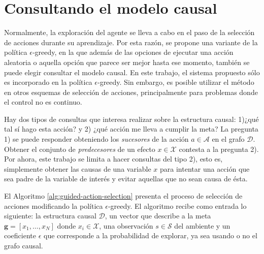\section{Consultando el modelo causal}

Normalmente, la exploración del agente se lleva a cabo en el paso de la selección de acciones
durante su aprendizaje. Por esta razón,
se propone una variante de la política $\epsilon$-greedy, en la que además de las opciones de ejecutar
una acción aleatoria o aquella opción que parece ser mejor hasta ese momento, también se puede elegir consultar el modelo causal.  En este trabajo,   el sistema propuesto sólo es incorporado en la política $\epsilon$-greedy. Sin embargo, es posible utilizar el método en otros esquemas de selección de acciones, principalmente para problemas donde el control no es continuo.

Hay dos tipos de consultas que interesa realizar 
sobre la estructura causal: 1)¿qué tal sí hago esta acción?
y 2) ¿qué acción me lleva a cumplir la meta?
La pregunta 1) se puede responder
obteniendo los \textit{sucesores} de la acción $a\in \mathcal{A}$
en el grafo $\mathcal{D}$. Obtener el conjunto de \textit{predecesores} de un efecto $x \in \mathcal{X}$ contesta
a la pregunta 2). Por ahora, este trabajo se limita a hacer consultas del tipo 2), esto es,
simplemente obtener las causas de una variable $x$ para intentar una acción que
sea padre de la variable de interés y evitar aquellas que no sean causa de ésta.


El Algoritmo \ref{alg:guided-action-selection} presenta el proceso 
de selección de acciones modificando la política
$\epsilon$-greedy.
El algoritmo recibe como entrada lo siguiente: la estructura causal $\mathcal{D}$, un vector que describe a la meta $\mathbf{g} = [x_1, \dots, x_N]$ donde $x_i \in \mathcal{X}$, una observación $s \in \mathcal{S}$ del ambiente y un coeficiente $\epsilon$ que corresponde a la probabilidad de explorar, ya sea usando o no el grafo causal. 

